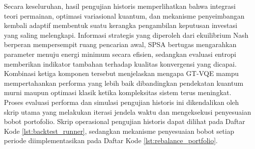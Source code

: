 Secara keseluruhan, hasil pengujian historis memperlihatkan bahwa integrasi teori permainan, optimasi variasional kuantum, dan mekanisme penyeimbangan kembali adaptif membentuk suatu kerangka pengambilan keputusan investasi yang saling melengkapi. Informasi strategis yang diperoleh dari ekuilibrium Nash berperan mempersempit ruang pencarian awal, SPSA bertugas mengarahkan parameter menuju energi minimum secara efisien, sedangkan evaluasi entropi memberikan indikator tambahan terhadap kualitas konvergensi yang dicapai. Kombinasi ketiga komponen tersebut menjelaskan mengapa GT-VQE mampu mempertahankan performa yang lebih baik dibandingkan pendekatan kuantum murni maupun optimasi klasik ketika kompleksitas sistem terus meningkat. Proses evaluasi performa dan simulasi pengujian historis ini dikendalikan oleh skrip utama yang melakukan iterasi jendela waktu dan mengeksekusi penyesuaian bobot portofolio. Skrip operasional pengujian historis dapat dilihat pada Daftar Kode \ref{lst:backtest_runner}, sedangkan mekanisme penyesuaian bobot setiap periode diimplementasikan pada Daftar Kode \ref{lst:rebalance_portfolio}.

